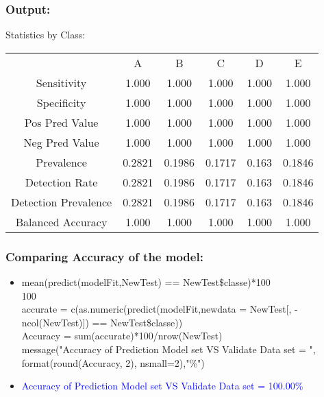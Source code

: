 \documentclass{beamer}
\begin{document}

\begin{frame}[fragile]
\frametitle{Output:}
\begin{block}{Statistics by Class:}\newline

\begin{center}
\begin{tabular}{ cccccc } 
  & A & B & C & D & E \\ 
Sensitivity & 1.000 & 1.000 & 1.000 & 1.000 & 1.000 \\
Specificity & 1.000 & 1.000 & 1.000 & 1.000 & 1.000 \\
Pos Pred Value & 1.000 & 1.000 & 1.000 & 1.000 & 1.000 \\
Neg Pred Value & 1.000 & 1.000 & 1.000 & 1.000 & 1.000 \\
Prevalence & 0.2821 & 0.1986 & 0.1717 & 0.163 & 0.1846 \\
Detection Rate & 0.2821 & 0.1986 & 0.1717 & 0.163 & 0.1846 \\
Detection Prevalence & 0.2821 & 0.1986 & 0.1717 & 0.163 & 0.1846 \\
Balanced Accuracy & 1.000 & 1.000 & 1.000 & 1.000 & 1.000 \\
\end{tabular}
\end{center}

\end{block}
\end{frame}



\begin{frame}[fragile]
\frametitle{Comparing Accuracy of the model:}
\begin{tcolorbox}
\begin{itemize}
\item mean(predict(modelFit,NewTest) == NewTest\$classe)*100\\
100\\
accurate = c(as.numeric(predict(modelFit,newdata = NewTest[, -ncol(NewTest)]) 
== NewTest\$classe))\\
Accuracy = sum(accurate)*100/nrow(NewTest)\\
message("Accuracy of Prediction Model set VS Validate Data set = ", 
format(round(Accuracy, 2), nsmall=2),"\%")\\
\item \textcolor{blue}{Accuracy of Prediction Model set VS Validate 
Data set = 100.00\%}


\end{itemize}
\end{tcolorbox}
\end{frame}
\end{document}
